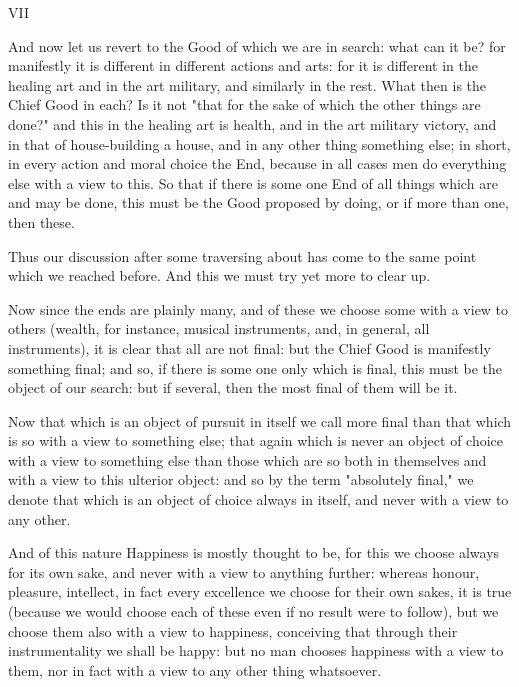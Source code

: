 VII

And now let us revert to the Good of which we are in search: what can it
be? for manifestly it is different in different actions and arts: for it
is different in the healing art and in the art military, and similarly
in the rest. What then is the Chief Good in each? Is it not "that for
the sake of which the other things are done?" and this in the healing
art is health, and in the art military victory, and in that of
house-building a house, and in any other thing something else; in short,
in every action and moral choice the End, because in all cases men do
everything else with a view to this. So that if there is some one End of
all things which are and may be done, this must be the Good proposed by
doing, or if more than one, then these.

Thus our discussion after some traversing about has come to the same
point which we reached before. And this we must try yet more to clear
up.

Now since the ends are plainly many, and of these we choose some with
a view to others (wealth, for instance, musical instruments, and, in
general, all instruments), it is clear that all are not final: but the
Chief Good is manifestly something final; and so, if there is some one
only which is final, this must be the object of our search: but if
several, then the most final of them will be it.

Now that which is an object of pursuit in itself we call more final than
that which is so with a view to something else; that again which is
never an object of choice with a view to something else than those which
are so both in themselves and with a view to this ulterior object: and
so by the term "absolutely final," we denote that which is an object of
choice always in itself, and never with a view to any other.

And of this nature Happiness is mostly thought to be, for this we choose
always for its own sake, and never with a view to anything further:
whereas honour, pleasure, intellect, in fact every excellence we choose
for their own sakes, it is true (because we would choose each of these
even if no result were to follow), but we choose them also with a view
to happiness, conceiving that through their instrumentality we shall be
happy: but no man chooses happiness with a view to them, nor in fact
with a view to any other thing whatsoever.

